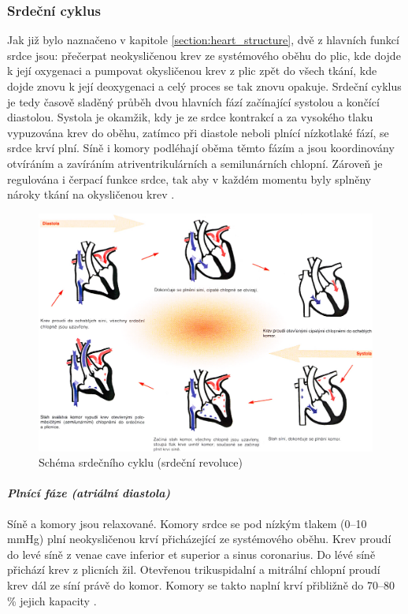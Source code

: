\subsubsection{Srdeční cyklus}
\label{section:cardiac_cycle}
Jak již bylo naznačeno v kapitole \ref{section:heart_structure}, dvě z hlavních
funkcí srdce jsou: přečerpat neokysličenou krev ze systémového oběhu do plic,
kde dojde k její oxygenaci a pumpovat okysličenou krev z plic zpět do všech
tkání, kde dojde znovu k její deoxygenaci a celý proces se tak znovu opakuje.
Srdeční cyklus je tedy časově sladěný průběh dvou hlavních fází začínající
systolou a končící diastolou. Systola je okamžik, kdy je ze srdce kontrakcí a za
vysokého tlaku vypuzována krev do oběhu, zatímco při diastole neboli plnící
nízkotlaké fází, se srdce krví plní. Síně i komory podléhají oběma těmto fázím a
jsou koordinovány otvíráním a zavíráním atriventrikulárních a semilunárních
chlopní. Zároveň je regulována i čerpací funkce srdce, tak aby v každém momentu
byly splněny nároky tkání na okysličenou krev
\cite{OpenStax,Weinhaus2005,Abbasi2014}.

\begin{figure}[h]
	\begin{center}
		\includegraphics[width=1\textwidth]{../assets/anatomy/cardiac_cycle}
		\caption{Schéma srdečního cyklu (srdeční revoluce) \cite{Trojan2002}}
		\label{img:cardiac_cycle}
	\end{center}
\end{figure}

\paragraph*{\textit{Plnící fáze (atriální diastola)}\\} Síně a komory jsou
relaxované. Komory srdce se pod nízkým tlakem (0--10 \si{\mmHg}) plní neokysličenou
krví přicházející ze systémového oběhu. Krev proudí do levé síně z venae cave
inferior et superior a sinus coronarius. Do lévé síně přichází krev z plicních
žil. Otevřenou trikuspidalní a mitrální chlopní proudí krev dál ze síní právě do
komor. Komory se takto naplní krví přibližně do 70--80 \% jejich kapacity
\cite{OpenStax}.

